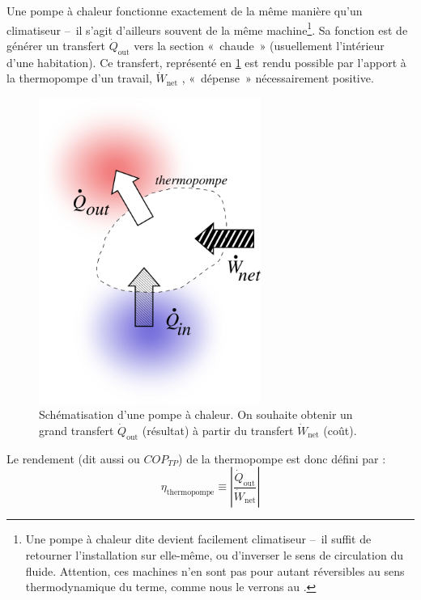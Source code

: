 		Une pompe à chaleur fonctionne exactement de la même manière qu’un climatiseur --\ il s’agit d’ailleurs souvent de la même machine\footnote{Une pompe à chaleur dite  devient facilement climatiseur --\ il suffit de retourner l’installation sur elle-même, ou d’inverser le sens de circulation du fluide. Attention, ces machines n’en sont pas pour autant réversibles au sens thermodynamique du terme, comme nous le verrons au \courssept.}\nolinebreak.
		Sa fonction est de générer un transfert $\dot{Q}_\text{out}$ vers la section «~chaude~» (usuellement l’intérieur d’une habitation). Ce transfert, représenté en \cref{fig_transferts_thermopompe} est rendu possible par l’apport à la thermopompe d’un travail, $\dot{W}_\text{net}$ , «~dépense~» nécessairement positive.

		\begin{figure}
			\begin{center}
				\includegraphics[height=10cm]{images/eff_thermopompe.png}
			\end{center}
			\caption{Schématisation d’une pompe à chaleur. On souhaite obtenir un grand transfert $\dot{Q}_\text{out}$ (résultat) à partir du transfert $\dot{W}_\text{net}$ (coût).}
			\label{fig_transferts_thermopompe}
		\end{figure}

		Le rendement (dit aussi  ou $COP_{TP}$) de la thermopompe est donc défini par :
		\begin{equation}
			\eta_\text{thermopompe} \equiv  \left| \frac{\dot{Q}_\text{out}}{\dot{W}_\text{net}} \right|
			\label{def_rendement_thermopompe}
		\end{equation}
		
